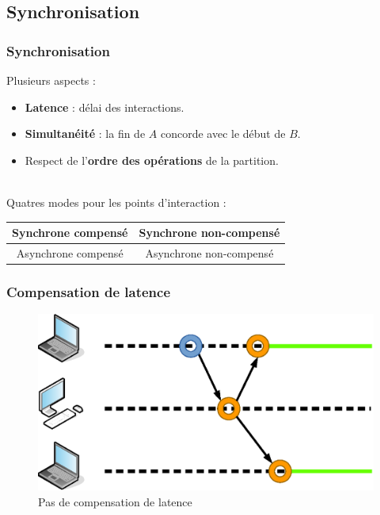 \documentclass[]{beamer}
\begin{document}
\subsection{Synchronisation}
\begin{frame}
\frametitle{Synchronisation}
\Large
Plusieurs aspects : 
\large
\begin{itemize}
	\item \textbf{Latence} : délai des interactions.
	\item \textbf{Simultanéité} : la fin de $A$ concorde avec le début de $B$.
	\item Respect de l'\textbf{ordre des opérations} de la partition.
\end{itemize}
~\\
\Large Quatres modes pour les points d'interaction : 
\large
\begin{table}
	\begin{tabular}{c|c}
	Synchrone compensé & Synchrone non-compensé \\
	\midrule
	Asynchrone compensé & Asynchrone non-compensé
	\end{tabular}
\end{table}

\end{frame}

\begin{frame}
\frametitle{Compensation de latence}
\begin{figure}
	\centering
	\includegraphics[width=\textwidth]{draw/noncompensated.eps}
	\caption{Pas de compensation de latence}
\end{figure}
\end{frame}
\end{document}
